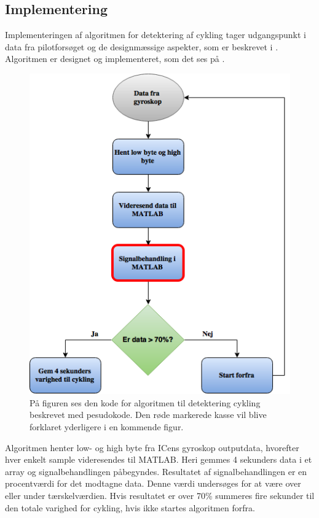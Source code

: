 \subsection{Implementering}
Implementeringen af algoritmen for detektering af cykling tager udgangspunkt i data fra pilotforsøget og de designmæssige aspekter, som er beskrevet i . Algoritmen er designet og implementeret, som det ses på .
\begin{figure}[H]
	\centering
	\includegraphics[scale=0.4]{figures/cDesign/Algoritme_cykling_basic.png}
	\caption{På figuren ses den kode for algoritmen til detektering cykling beskrevet med pesudokode. Den røde markerede kasse vil blive forklaret yderligere i en kommende figur.}
	\label{fig:basic_cykling}
\end{figure}
Algoritmen henter low- og high byte fra ICens gyroskop outputdata, hvorefter hver enkelt sample videresendes til MATLAB. Heri gemmes 4 sekunders data i et array og signalbehandlingen påbegyndes. Resultatet af signalbehandlingen er en procentværdi for det modtagne data. Denne værdi undersøges for at være over eller under tærskelværdien. Hvis resultatet er over 70\% summeres fire sekunder til den totale varighed for cykling, hvis ikke startes algoritmen forfra.
